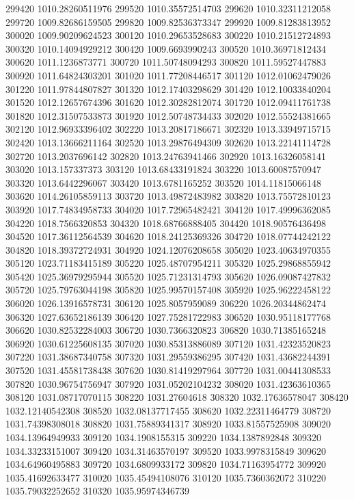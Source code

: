 {299420 1010.28260511976
299520 1010.35572514703
299620 1010.32311212058
299720 1009.82686159505
299820 1009.82536373347
299920 1009.81283813952
300020 1009.90209624523
300120 1010.29653528683
300220 1010.21512724893
300320 1010.14094929212
300420 1009.6693990243
300520 1010.36971812434
300620 1011.1236873771
300720 1011.50748094293
300820 1011.59527447883
300920 1011.64824303201
301020 1011.77208446517
301120 1012.01062479026
301220 1011.97844807827
301320 1012.17403298629
301420 1012.10033840204
301520 1012.12657674396
301620 1012.30282812074
301720 1012.09411761738
301820 1012.31507533873
301920 1012.50748734433
302020 1012.55524381665
302120 1012.96933396402
302220 1013.20817186671
302320 1013.33949715715
302420 1013.13666211164
302520 1013.29876494309
302620 1013.22141114728
302720 1013.2037696142
302820 1013.24763941466
302920 1013.16326058141
303020 1013.157337373
303120 1013.68433191824
303220 1013.60087570947
303320 1013.6442296067
303420 1013.6781165252
303520 1014.11815066148
303620 1014.26105859113
303720 1013.49872483982
303820 1013.75572810123
303920 1017.74834958733
304020 1017.72965482421
304120 1017.49996362085
304220 1018.7566320853
304320 1018.68766888405
304420 1018.90576436498
304520 1017.36112564539
304620 1018.24125369326
304720 1018.07744242122
304820 1018.39372724931
304920 1024.12076208658
305020 1023.40634970355
305120 1023.71183415189
305220 1025.48707954211
305320 1025.29868855942
305420 1025.36979295944
305520 1025.71231314793
305620 1026.09087427832
305720 1025.79763044198
305820 1025.99570157408
305920 1025.96222458122
306020 1026.13916578731
306120 1025.8057959089
306220 1026.20344862474
306320 1027.63652186139
306420 1027.75281722983
306520 1030.95118177768
306620 1030.82532284003
306720 1030.7366320823
306820 1030.71385165248
306920 1030.61225608135
307020 1030.85313886089
307120 1031.42323520823
307220 1031.38687340758
307320 1031.29559386295
307420 1031.43682244391
307520 1031.45581738438
307620 1030.81419297964
307720 1031.00441308533
307820 1030.96754756947
307920 1031.05202104232
308020 1031.42363610365
308120 1031.08717070115
308220 1031.27604618
308320 1032.17636578047
308420 1032.12140542308
308520 1032.08137717455
308620 1032.22311464779
308720 1031.74398308018
308820 1031.75889341317
308920 1033.81557525908
309020 1034.13964949933
309120 1034.1908155315
309220 1034.1387892848
309320 1034.33233151007
309420 1034.31463570197
309520 1033.9978315849
309620 1034.64960495883
309720 1034.6809933172
309820 1034.71163954772
309920 1035.41692633477
310020 1035.45494108076
310120 1035.7360362072
310220 1035.79032252652
310320 1035.95974346739
}
